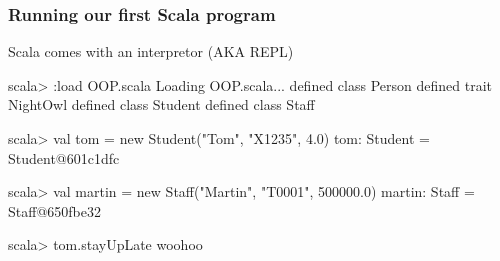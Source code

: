 \documentclass{beamer}
\begin{document}


\begin{frame}[fragile]
\frametitle{Running our first Scala program}
Scala comes with an interpretor (AKA REPL)

\begin{code}
scala> :load OOP.scala
Loading OOP.scala...
defined class Person
defined trait NightOwl
defined class Student
defined class Staff

scala> val tom = new Student("Tom", "X1235", 4.0)
tom: Student = Student@601c1dfc

scala> val martin = new Staff("Martin", "T0001", 500000.0)
martin: Staff = Staff@650fbe32

scala> tom.stayUpLate
woohoo
\end{code}
\end{frame}

\end{document}
